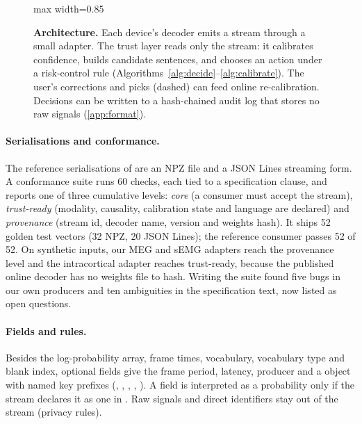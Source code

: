\begin{figure}[H]
  \centering
  \begin{adjustbox}{max width=0.85\linewidth}\end{adjustbox}
  \caption{\textbf{Architecture.} Each device's decoder emits a stream through a small adapter. The trust layer reads only the stream: it calibrates confidence, builds candidate sentences, and chooses an action under a risk-control rule (Algorithms~\ref{alg:decide}--\ref{alg:calibrate}). The user's corrections and picks (dashed) can feed online re-calibration. Decisions can be written to a hash-chained audit log that stores no raw signals (\cref{app:format}).}
  \label{fig:arch}
\end{figure}

\paragraph{Serialisations and conformance.} The reference serialisations of \nts{} are an NPZ file and a JSON Lines streaming form. A conformance suite runs 60 checks, each tied to a specification clause, and reports one of three cumulative levels: \emph{core} (a consumer must accept the stream), \emph{trust-ready} (modality, causality, calibration state and language are declared) and \emph{provenance} (stream id, decoder name, version and weights hash). It ships 52 golden test vectors (32 NPZ, 20 JSON Lines); the reference consumer passes 52 of 52. On synthetic inputs, our MEG and sEMG adapters reach the provenance level and the intracortical adapter reaches trust-ready, because the published online decoder has no weights file to hash. Writing the suite found five bugs in our own producers and ten ambiguities in the specification text, now listed as open questions.

\paragraph{Fields and rules.} Besides the log-probability array, frame times, vocabulary, vocabulary type and blank index, optional fields give the frame period, latency, producer and a  object with named key prefixes (, , , , ). A field is interpreted as a probability only if the stream declares it as one in . Raw signals and direct identifiers stay out of the stream (privacy rules).

